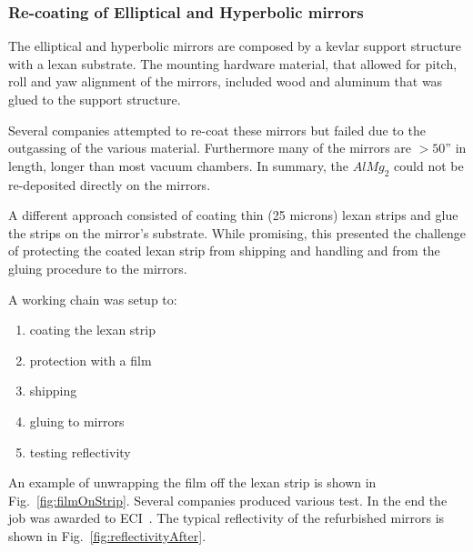 \subsubsection{Re-coating of Elliptical and Hyperbolic mirrors}

The elliptical and hyperbolic mirrors are composed by a kevlar support structure with a lexan substrate. The mounting hardware
material, that allowed for pitch, roll and yaw alignment of the mirrors, included wood and aluminum that was glued to the support structure.

Several companies attempted to re-coat these mirrors but failed due to the outgassing of the various material. Furthermore many of the mirrors
are $> 50$'' in length, longer than most vacuum chambers. In summary, the $AlMg_2$ could not be re-deposited directly on the mirrors.

A different approach consisted of coating thin (25 microns) lexan strips and glue the strips on the mirror's substrate. While promising, this
presented the challenge of protecting the coated lexan strip from shipping and handling and from the gluing procedure to the mirrors.

A working chain was setup to:

\begin{enumerate}
	\item coating the lexan strip
	\item protection with a film
	\item shipping
	\item gluing to mirrors
	\item testing reflectivity
\end{enumerate}

An example of unwrapping the film off the lexan strip is shown in Fig.~\ref{fig:filmOnStrip}. Several companies produced various test. In the end the
job was awarded to ECI~\cite{ECI}. The typical reflectivity of the refurbished mirrors is shown in Fig.~\ref{fig:reflectivityAfter}.

